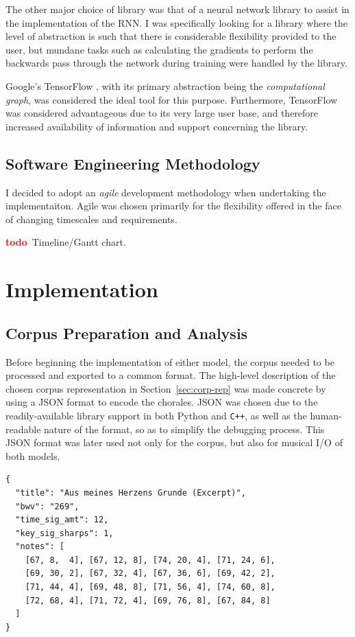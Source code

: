 \documentclass[12pt,a4paper,twoside,openright]{report}
\newcommand{\todo}{\textcolor{red}{\textbf{todo}~}}
\begin{document}
The other major choice of library was that of a neural network library to assist
in the implementation of the RNN. I was specifically looking for a library where
the level of abstraction is such that there is considerable flexibility provided
to the user, but mundane tasks such as calculating the gradients to perform the
backwards pass through the network during training were handled by the library.

Google's TensorFlow \cite{abadi2016tensorflow}, with its primary abstraction
being the \emph{computational graph}, was considered the ideal tool for this
purpose.  Furthermore, TensorFlow was considered advantageous due to
its very large user base, and therefore increased availability of information
and support concerning the library.

\section{Software Engineering Methodology}

I decided to adopt an \emph{agile} development methodology when undertaking the
implementaiton. Agile was chosen primarily for the flexibility offered in the
face of changing timescales and requirements.

\todo Timeline/Gantt chart.

\chapter{Implementation}\label{chap:impl}

\section{Corpus Preparation and Analysis}

Before beginning the implementation of either model, the corpus needed to be
processed and exported to a common format. The high-level description of the
chosen corpus representation in Section~\ref{sec:corp-rep} was made concrete by
using a JSON format to encode the chorales. JSON was chosen due to the
readily-available library support in both Python and \texttt{C++}, as well as
the human-readable nature of the format, so as to simplify the debugging
process. This JSON format was later used not only for the corpus, but also for
musical I/O of both models.

\vspace{4mm}
\begin{verbatim}
{
  "title": "Aus meines Herzens Grunde (Excerpt)",
  "bwv": "269",
  "time_sig_amt": 12,
  "key_sig_sharps": 1,
  "notes": [
    [67, 8,  4], [67, 12, 8], [74, 20, 4], [71, 24, 6], 
    [69, 30, 2], [67, 32, 4], [67, 36, 6], [69, 42, 2], 
    [71, 44, 4], [69, 48, 8], [71, 56, 4], [74, 60, 8], 
    [72, 68, 4], [71, 72, 4], [69, 76, 8], [67, 84, 8]
  ]
}
\end{verbatim}
\end{document}
